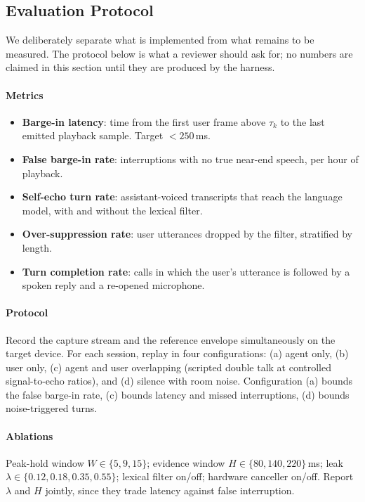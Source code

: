 \subsection{Evaluation Protocol}

We deliberately separate what is implemented from what remains to be measured.
The protocol below is what a reviewer should ask for; no numbers are claimed in
this section until they are produced by the harness.

\paragraph{Metrics}
\begin{itemize}
  \item \textbf{Barge-in latency}: time from the first user frame above
        $\tau_k$ to the last emitted playback sample. Target $<250$\,ms.
  \item \textbf{False barge-in rate}: interruptions with no true near-end
        speech, per hour of playback.
  \item \textbf{Self-echo turn rate}: assistant-voiced transcripts that reach
        the language model, with and without the lexical filter.
  \item \textbf{Over-suppression rate}: user utterances dropped by the
        filter, stratified by length.
  \item \textbf{Turn completion rate}: calls in which the user's utterance is
        followed by a spoken reply and a re-opened microphone.
\end{itemize}

\paragraph{Protocol}
Record the capture stream and the reference envelope simultaneously on the
target device. For each session, replay in four configurations:
(a) agent only, (b) user only, (c) agent and user overlapping (scripted
double talk at controlled signal-to-echo ratios), and (d) silence with room
noise. Configuration (a) bounds the false barge-in rate, (c) bounds latency and
missed interruptions, (d) bounds noise-triggered turns.

\paragraph{Ablations}
Peak-hold window $W \in \{5, 9, 15\}$; evidence window
$H \in \{80, 140, 220\}$\,ms; leak $\lambda \in \{0.12, 0.18, 0.35, 0.55\}$;
lexical filter on/off; hardware canceller on/off. Report $\lambda$ and $H$
jointly, since they trade latency against false interruption.

